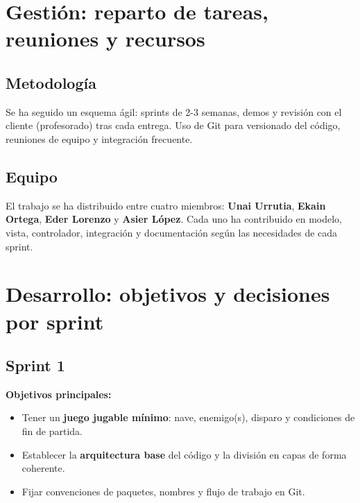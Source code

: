 \documentclass[12pt, a4paper]{article}
\begin{document}
\section{Gestión: reparto de tareas, reuniones y recursos}
\label{sec:gestion}

\subsection{Metodología}

Se ha seguido un esquema ágil: sprints de 2-3 semanas, demos y revisión con el cliente (profesorado) tras cada entrega. Uso de Git para versionado del código, reuniones de equipo y integración frecuente.

\subsection{Equipo}

El trabajo se ha distribuido entre cuatro miembros: \textbf{Unai Urrutia}, \textbf{Ekain Ortega}, \textbf{Eder Lorenzo} y \textbf{Asier López}. Cada uno ha contribuido en modelo, vista, controlador, integración y documentación según las necesidades de cada sprint.


\section{Desarrollo: objetivos y decisiones por sprint}

\subsection{Sprint 1}

\textbf{Objetivos principales:}
\begin{itemize}[leftmargin=2em]
    \item Tener un \textbf{juego jugable mínimo}: nave, enemigo(s), disparo y condiciones de fin de partida.
    \item Establecer la \textbf{arquitectura base} del código y la división en capas de forma coherente.
    \item Fijar convenciones de paquetes, nombres y flujo de trabajo en Git.
\end{itemize}
\end{document}
